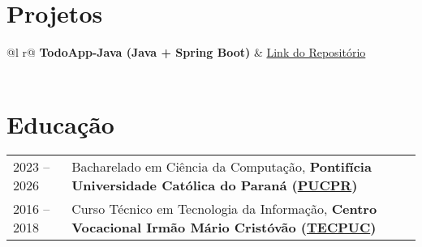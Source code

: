 \documentclass[a4paper,12pt]{article}
\begin{document}

    \section{Projetos}
    \begin{tabularx}{\linewidth}{ @{}l r@{} }
        \textbf{TodoApp-Java (Java + Spring Boot)} & \hfill \href{https://github.com/JoaoVLima/TodoApp-Java}{Link do Repositório} \\[3.75pt]
         \\
    \end{tabularx}


    \section{Educação}
    \begin{tabularx}{\linewidth}{@{}l X@{}}
        2023 -- 2026 & Bacharelado em Ciência da Computação, \textbf{Pontifícia Universidade Católica do Paraná (\href{https://www.pucpr.br}{PUCPR})} \\
        2016 -- 2018 & Curso Técnico em Tecnologia da Informação, \textbf{Centro Vocacional Irmão Mário Cristóvão (\href{http://www.tecpuc.com.br}{TECPUC})} \\
    \end{tabularx}


    \vfill
\end{document}
